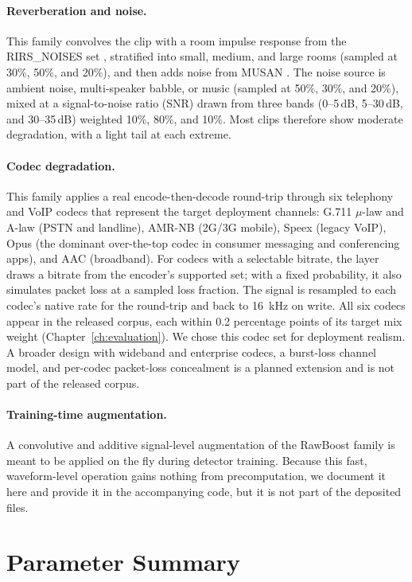 \documentclass[11pt]{report}
\begin{document}
\paragraph{Reverberation and noise.} This family
convolves the clip with a room impulse response from the RIRS\_NOISES set
\citep{ko2017rir}, stratified into small, medium, and large rooms
(sampled at 30\%, 50\%, and 20\%), and then adds noise from MUSAN
\citep{musan}. The noise source is ambient noise, multi-speaker babble, or
music (sampled at 50\%, 30\%, and 20\%), mixed at a signal-to-noise ratio
(SNR) drawn from three bands (0--5\,dB, 5--30\,dB, and 30--35\,dB)
weighted 10\%, 80\%, and 10\%. Most clips therefore show moderate
degradation, with a light tail at each extreme.

\paragraph{Codec degradation.} This family applies a real
encode-then-decode round-trip through six telephony and VoIP codecs that
represent the target deployment channels: G.711 $\mu$-law and A-law (PSTN
and landline), AMR-NB (2G/3G mobile), Speex (legacy VoIP), Opus (the
dominant over-the-top codec in consumer messaging and conferencing apps),
and AAC (broadband). For codecs with a selectable bitrate, the layer
draws a bitrate from the encoder's supported set; with a fixed
probability, it also simulates packet loss at a sampled loss fraction.
The signal is resampled to each codec's native rate for the round-trip
and back to \SI{16}{\kilo\hertz} on write. All six codecs appear in the
released corpus, each within 0.2 percentage points of its target mix
weight (Chapter~\ref{ch:evaluation}). We chose this codec set for
deployment realism. A broader design with wideband and enterprise codecs,
a burst-loss channel model, and per-codec packet-loss concealment is a
planned extension and is not part of the released corpus.

\paragraph{Training-time augmentation.} A convolutive and
additive signal-level augmentation of the RawBoost family
\citep{tak2022ssl} is meant to be applied on the fly during detector
training. Because this fast, waveform-level operation gains nothing from
precomputation, we document it here and provide it in the accompanying
code, but it is not part of the deposited files.

\section{Parameter Summary}
\label{sec:params}
\end{document}
